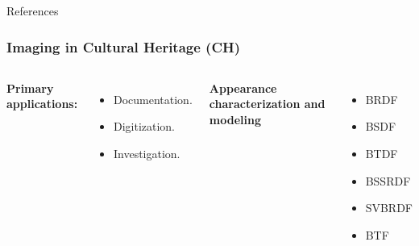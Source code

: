 \documentclass{beamer}
\begin{document}


{

}

\appendix
{

\begin{frame}[allowframebreaks]{References}
  \renewcommand*{\bibfont}{\tiny}
  \setlength{\bibitemsep}{1pt}
  \setlength{\bibnamesep}{0pt}
  \setlength{\bibparsep}{0pt}
  \addtolength{\textheight}{-2.5cm}
  \printbibliography
\end{frame}

\begin{frame}[t]
\frametitle{Imaging in Cultural Heritage (CH)}
    
    \begin{columns}[t]

    \textbf{Primary applications:}
        \begin{itemize}
            \item<2-> Documentation.
            \item<2-> Digitization.
            \item<2-> Investigation.
        \end{itemize}

    \textbf{Appearance characterization and modeling}
    \begin{itemize}
        \item<4-> BRDF \footnotemark
        \item<5-> BSDF
        \item<5-> BTDF
        \item<5-> BSSRDF
        \item<5-> SVBRDF
        \item<5-> BTF
    \end{itemize}


\end{columns}
\end{frame}}
\end{document}
